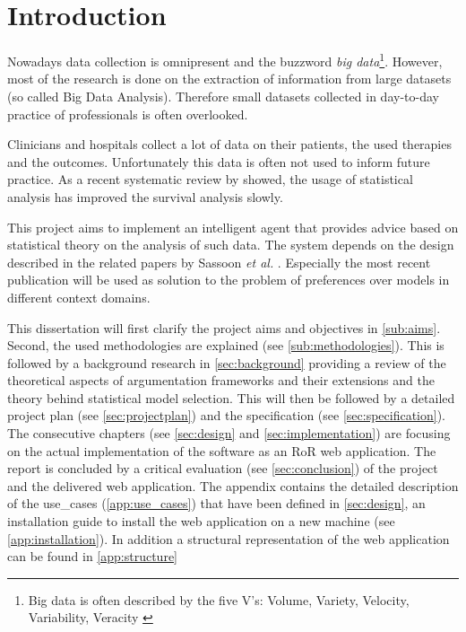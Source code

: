 \section{Introduction}


Nowadays data collection is omnipresent and the buzzword \textit{big data}\footnote{Big data is often described by the five V's: Volume, Variety, Velocity, Variability, Veracity \cite{Hilbert2015}}. However, most of the research is done on the extraction of information from large datasets (so called Big Data Analysis). Therefore small datasets collected in day-to-day practice of professionals is often overlooked. 

Clinicians and hospitals collect a lot of data on their patients, the used therapies and the outcomes. Unfortunately this data is often not used to inform future practice. As a recent systematic review by \cite{survivalAnalysis} showed, the usage of statistical analysis has improved the survival analysis slowly. 

This project aims to implement an intelligent agent that provides advice based on statistical theory on the analysis of such data. The system depends on the design described in the related papers by Sassoon \textit{et al.} \cite{sassoon2014,sassoon2016,sassoon2016CD}. Especially the most recent publication will be used as solution to the problem of preferences over models in different context domains. 


This dissertation will first clarify the project aims and objectives in \autoref{sub:aims}. Second, the used methodologies are explained (see \autoref{sub:methodologies}). This is followed by a background research in \autoref{sec:background} providing a review of the theoretical aspects of argumentation frameworks and their extensions and the theory behind statistical model selection. 
This will then be followed by a detailed project plan (see \autoref{sec:projectplan}) and the specification (see \autoref{sec:specification}). The consecutive chapters (see \autoref{sec:design} and \ref{sec:implementation}) are focusing on the actual implementation of the software as an \gls{RoR} web application. 
The report is concluded by a critical evaluation (see \autoref{sec:conclusion}) of the project and the delivered web application. 
The appendix contains the detailed description of the \glspl{use_case} (\autoref{app:use_cases}) that have been defined in \autoref{sec:design}, an installation guide to install the web application on a new machine (see \autoref{app:installation}). In addition a structural representation of the web application can be found in \autoref{app:structure}

